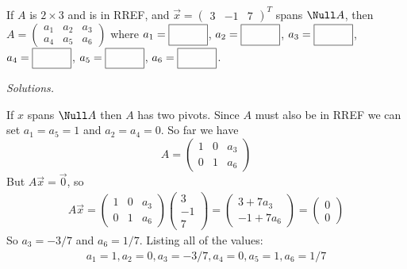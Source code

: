 \ifnum {}
    If $A$ is $2 \times 3$ and is in RREF, and $\vec x = \begin{pmatrix} 3&-1&7\end{pmatrix}^T$ spans $\Null A$, then $A=\begin{pmatrix} a_1 & a_2 & a_3 \\ a_4 & a_5 & a_6 \end{pmatrix} $ where 
    $a_1 = \framebox{\strut\hspace{1.0cm}}$, 
    $a_2 = \framebox{\strut\hspace{1.0cm}}$, 
    $a_3 = \framebox{\strut\hspace{1.0cm}}$, 
    $a_4 = \framebox{\strut\hspace{1.0cm}}$,
    $a_5 = \framebox{\strut\hspace{1.0cm}}$,
    $a_6 = \framebox{\strut\hspace{1.0cm}}$.

    \ifnum {} {\color{DarkBlue} \textit{Solutions.} 

    If $x$ spans $\Null A$ then $A$ has two pivots. Since $A$ must also be in RREF we can set $a_1=a_5=1$ and $a_2=a_4 = 0$. So far we have
    $$A = \begin{pmatrix} 1&0&a_3\\0&1&a_6\end{pmatrix}$$
    But $A\vec x = \vec 0$, so 
    \begin{align}
        A\vec x = \begin{pmatrix} 1&0&a_3\\0&1&a_6\end{pmatrix}\begin{pmatrix} 3\\-1\\7\end{pmatrix} = \begin{pmatrix} 3+7a_3 \\-1+7a_6 \end{pmatrix} = \begin{pmatrix} 0\\0 \end{pmatrix}
    \end{align}
    So $a_3 = -3/7$ and $a_6 = 1/7$. Listing all of the values:
    \begin{align}
        a_1 = 1, a_2 = 0, a_3 = -3/7, a_4=0, a_5 = 1, a_6 = 1/7
    \end{align}
    } 
   \else
   \fi
\fi     



